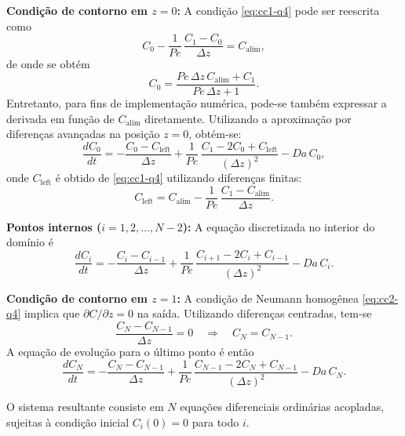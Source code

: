 \documentclass{article}
\begin{document}
\textbf{Condição de contorno em $z=0$:} A condição \eqref{eq:cc1-q4} pode ser reescrita como
\begin{equation*}
  C_0 - \frac{1}{Pe}\,\frac{C_1 - C_0}{\Delta z} = C_{\text{alim}},
\end{equation*}
de onde se obtém
\begin{equation}
  C_0 = \frac{Pe\,\Delta z\,C_{\text{alim}} + C_1}{Pe\,\Delta z + 1}. \label{eq:c0-q4}
\end{equation}
Entretanto, para fins de implementação numérica, pode-se também expressar a derivada em função de $C_{\text{alim}}$ diretamente. Utilizando a aproximação por diferenças avançadas na posição $z=0$, obtém-se:
\begin{equation}
  \frac{dC_0}{dt} = -\frac{C_0 - C_{\text{left}}}{\Delta z} + \frac{1}{Pe}\,\frac{C_1 - 2C_0 + C_{\text{left}}}{(\Delta z)^2} - Da\,C_0, \label{eq:dc0-q4}
\end{equation}
onde $C_{\text{left}}$ é obtido de \eqref{eq:cc1-q4} utilizando diferenças finitas:
\begin{equation}
  C_{\text{left}} = C_{\text{alim}} - \frac{1}{Pe}\,\frac{C_1 - C_{\text{alim}}}{\Delta z}. \label{eq:cleft-q4}
\end{equation}

\textbf{Pontos internos ($i=1,2,\ldots,N-2$):} A equação discretizada no interior do domínio é
\begin{equation}
  \frac{dC_i}{dt} = -\frac{C_i - C_{i-1}}{\Delta z} + \frac{1}{Pe}\,\frac{C_{i+1} - 2C_i + C_{i-1}}{(\Delta z)^2} - Da\,C_i. \label{eq:dci-q4}
\end{equation}

\textbf{Condição de contorno em $z=1$:} A condição de Neumann homogênea \eqref{eq:cc2-q4} implica que $\partial C/\partial z = 0$ na saída. Utilizando diferenças centradas, tem-se
\begin{equation*}
  \frac{C_N - C_{N-1}}{\Delta z} = 0 \quad \Rightarrow \quad C_N = C_{N-1}.
\end{equation*}
A equação de evolução para o último ponto é então
\begin{equation}
  \frac{dC_N}{dt} = -\frac{C_N - C_{N-1}}{\Delta z} + \frac{1}{Pe}\,\frac{C_{N-1} - 2C_N + C_{N-1}}{(\Delta z)^2} - Da\,C_N. \label{eq:dcn-q4}
\end{equation}

O sistema resultante consiste em $N$ equações diferenciais ordinárias acopladas, sujeitas à condição inicial $C_i(0) = 0$ para todo $i$.
\end{document}
